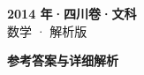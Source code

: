 \documentclass[zihao=-4, a4paper]{ctexart}
\begin{document}
\begin{center}
  {\Large\bfseries 2014 年·四川卷·文科}\\[4pt]
  {\large 数学 · 解析版}
\end{center}
\medskip
{}

\clearpage
{}
\begin{center}{\Large\bfseries 参考答案与详细解析}\end{center}
\medskip

\end{document}
